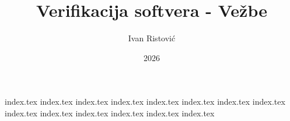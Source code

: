 \documentclass[12pt]{article}
\title{Verifikacija softvera - Vežbe}
\author{Ivan Ristović}
\date{2026}
\begin{document}
\maketitle

\begin{abstract}

\end{abstract}

\tableofcontents

{index.tex}
{index.tex}
{index.tex}
{index.tex}
{index.tex}
{index.tex}
{index.tex}
{index.tex}
{index.tex}
{index.tex}
{index.tex}
{index.tex}
{index.tex}
{index.tex}
\end{document}
